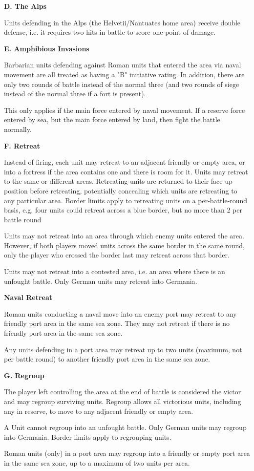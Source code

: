 \textbf{D. The Alps}
\par
Units defending in the Alps (the Helvetii/Nantuates home area) receive double defense, i.e. it requires two hits in battle to score one point of damage.

\textbf{E. Amphibious Invasions}
\par
Barbarian units defending against Roman units that entered the area via naval movement are all treated as having a "B" initiative rating. In addition, there are only two rounds of battle instead of the normal three (and two rounds of siege instead of the normal three if a fort is present). 

This only applies if the main force entered by naval movement. If a reserve force entered by sea, but the main force entered by land, then fight the battle normally. 

\textbf{F. Retreat}
\par
Instead of firing, each unit may retreat to an adjacent friendly or empty area, or into a fortress if the area contains one and there is room for it. Units may retreat to the same or different areas. Retreating units are returned to their face up position before retreating, potentially concealing which units are retreating to any particular area. Border limits apply to retreating units on a per-battle-round basis, e.g. four units could retreat across a blue border, but no more than 2 per battle round

Units may not retreat into an area through which enemy units entered the area. However, if both players moved units across the same border in the same round, only the player who crossed the border last may retreat across that border.

Units may not retreat into a contested area, i.e. an area where there is an unfought battle. Only German units may retreat into Germania.

\textbf{Naval Retreat}
\par
Roman units conducting a naval move into an enemy port may retreat to any friendly port area in the same sea zone. They may not retreat if there is no friendly port area in the same sea zone.

Any units defending in a port area may retreat up to two units (maximum, not per battle round) to another friendly port area in the same sea zone.

\textbf{G. Regroup}
\par
The player left controlling the area at the end of battle is considered the victor and may regroup surviving units. Regroup allows all victorious units, including any in reserve, to move to any adjacent friendly or empty area.

A Unit cannot regroup into an unfought battle. Only German units may regroup into Germania. Border limits apply to regrouping units.

Roman units (only) in a port area may regroup into a friendly or empty port area in the same sea zone, up to a maximum of two units per area.